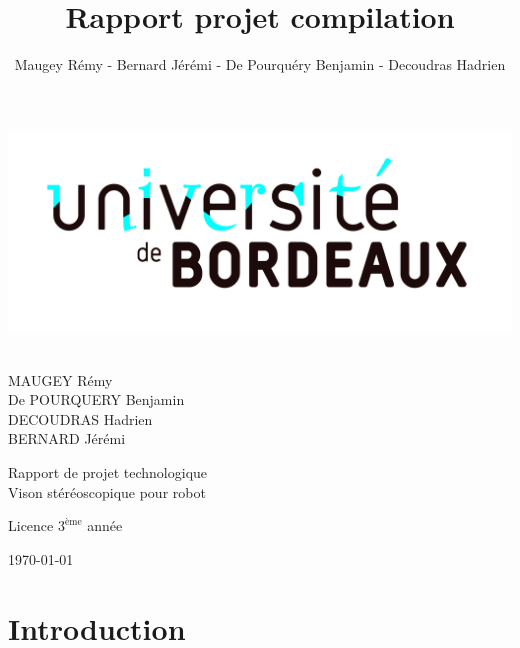 \documentclass[12pt,a4paper]{report}
\author{Maugey Rémy - Bernard Jérémi - De Pourquéry Benjamin - Decoudras Hadrien}
\title{Rapport projet compilation}
\begin{document}
\begin{titlepage}
  \begin{sffamily}
  \begin{center}

    \includegraphics[scale=0.05]{logo.jpg}~\\[1.5cm]
    \begin{minipage}{0.43\textwidth}
      \begin{flushleft} \large
		MAUGEY Rémy\\
		De POURQUERY Benjamin\\
		DECOUDRAS Hadrien\\
		BERNARD Jérémi\\		
		
      \end{flushleft}
    \end{minipage}

	\vspace*{\fill}
	\Huge{Rapport de projet technologique}\\
	\Large{Vison stéréoscopique pour robot}\\
	\vspace*{\fill}

	\vfill
    \begin{small}
 	Licence $3^{\text{ème}}$ année\\
 	\end{small}
    {\large \today}\\

  \end{center}
  \end{sffamily}
\end{titlepage}

\chapter{Introduction}
\end{document}
